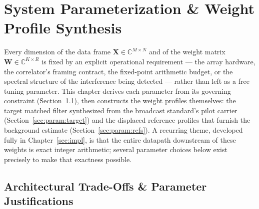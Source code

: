 
\chapter{System Parameterization \& Weight Profile Synthesis}
\label{sec:param}

Every dimension of the data frame $\mathbf{X} \in \mathbb{C}^{M \times N}$ and of the weight matrix $\mathbf{W} \in \mathbb{C}^{K \times R}$ is fixed by an explicit operational requirement --- the array hardware, the correlator's framing contract, the fixed-point arithmetic budget, or the spectral structure of the interference being detected --- rather than left as a free tuning parameter. This chapter derives each parameter from its governing constraint (Section~\ref{sec:param:tradeoffs}), then constructs the weight profiles themselves: the target matched filter synthesized from the broadcast standard's pilot carrier (Section~\ref{sec:param:target}) and the displaced reference profiles that furnish the background estimate (Section~\ref{sec:param:refs}). A recurring theme, developed fully in Chapter~\ref{sec:impl}, is that the entire datapath downstream of these weights is exact integer arithmetic; several parameter choices below exist precisely to make that exactness possible.

\section{Architectural Trade-Offs \& Parameter Justifications}
\label{sec:param:tradeoffs}


